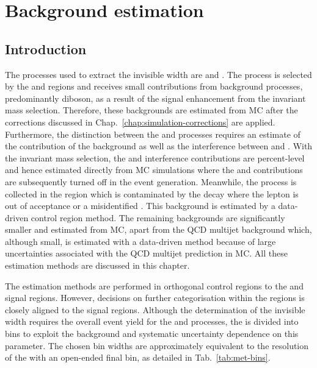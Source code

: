\chapter{Background estimation}
\label{chap:backgrounds}


\section{Introduction}

The processes used to extract the \PZ invisible width are \IZvv and \IZll. The \IZll process is selected by the \dimuplusjets and \dieleplusjets regions and receives small contributions from background processes, predominantly diboson, as a result of the signal enhancement from the invariant mass selection. Therefore, these backgrounds are estimated from MC after the corrections discussed in Chap.~\ref{chap:simulation-corrections} are applied. Furthermore, the distinction between the \IDYll and \IZll processes requires an estimate of the contribution of the \Pgstar background as well as the interference between \PZ and \Pgstar. With the invariant mass selection, the \Pgstar and interference contributions are percent-level and hence estimated directly from MC simulations where the \PZ and \Pgstar contributions are subsequently turned off in the event generation. Meanwhile, the \IZvv process is collected in the \metplusjets region which is contaminated by the \IWlv decay where the lepton is out of acceptance or a misidentified \Ptauh.  This \IWlv background is estimated by a data-driven control region method. The remaining backgrounds are significantly smaller and estimated from MC, apart from the QCD multijet background which, although small, is estimated with a data-driven method because of large uncertainties associated with the QCD multijet prediction in MC. All these estimation methods are discussed in this chapter.

The estimation methods are performed in orthogonal control regions to the \metplusjets and \diellplusjets signal regions. However, decisions on further categorisation within the regions is closely aligned to the signal regions.  Although the determination of the \PZ invisible width requires the overall event yield for the \IZvv and \IZll processes, the \recoil is divided into bins to exploit the background and systematic uncertainty dependence on this parameter. The chosen bin widths are approximately equivalent to the resolution of the \recoil with an open-ended final bin, as detailed in Tab.~\ref{tab:met-bins}.

